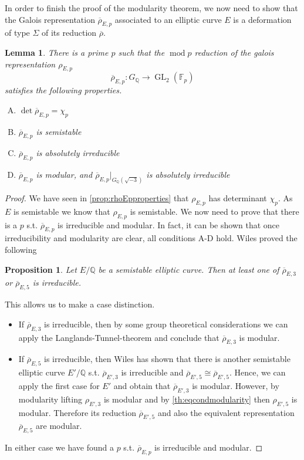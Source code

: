\documentclass{article}
\theoremstyle{plain}%
\newtheorem{lemma}[theorem]{Lemma}
\newtheorem{proposition}[theorem]{Proposition}
\theoremstyle{definition}
\theoremstyle{remark}
\newcommand{\GL}{\operatorname{GL}}
\begin{document}
In order to finish the proof of the modularity theorem, we now need to show that
the Galois representation \(\overline{\rho}_{E,p}\) associated to an elliptic curve \(E\)
is a deformation of type \(\Sigma\) of its reduction \(\overline{\rho}\).
\begin{lemma}\label{lem:ADproperties}
    There is a prime \(p\) such that the \(\operatorname{mod} p\) reduction of the galois representation \(\rho_{E,p}\)
    \[
        \overline{\rho}_{E,p} \colon G_\mathbb{Q} \to \GL_2(\mathbb{F}_p)
    \]
    satisfies the following properties.
    \begin{enumerate}[(A)]
        \item \(\det \overline{\rho}_{E,p} = \chi_p\)
        \item \(\overline{\rho}_{E,p}\) is semistable
        \item \(\overline{\rho}_{E,p}\) is absolutely irreducible
        \item \(\overline{\rho}_{E,p}\) is modular, and \(\overline{\rho}_{E,p}|_{G_\mathbb{Q}(\sqrt{-3})}\) is absolutely irreducible
    \end{enumerate}
\end{lemma}
\begin{proof}
    We have seen in \cref{prop:rhoEpproperties} that \(\rho_{E, p}\) has determinant \(\chi_p\). %
    As \(E\) is semistable we know that \(\rho_{E, p}\) is semistable. %
    We now need to prove that there is a \(p\) s.t. \(\overline{\rho}_{E,p}\) is irreducible and modular.
    In fact, it can be shown that once irreducibility and modularity are clear, all conditions A-D hold.
    Wiles proved the following
    \begin{proposition}
        Let \(E/\mathbb{Q}\) be a semistable elliptic curve. Then at least one of 
        \(\overline \rho_{E,3}\) or  \(\overline \rho_{E,5}\) is irreducible.
    \end{proposition}%
    This allows us to make a case distinction.
    \begin{itemize}
        \item If \(\overline \rho_{E,3}\) is irreducible, then by some group theoretical considerations 
        we can apply the Langlands-Tunnel-theorem and conclude that \(\overline{\rho}_{E, 3}\) is modular.
        \item If \(\overline \rho_{E,5}\) is irreducible, then Wiles has shown that there is another 
        semistable elliptic curve \(E'/\mathbb{Q}\) s.t. \(\overline{\rho}_{E',3}\) 
        is irreducible and \(\overline{\rho}_{E', 5} \cong \overline{\rho}_{E', 5}\).
        Hence, we can apply the first case for \(E'\) and obtain that \(\overline{\rho}_{E',3}\) is modular.
        However, by modularity lifting \(\rho_{E', 3}\) is modular and by \cref{th:eqcondmodularity}
        then \(\rho_{E', 5}\) is modular. Therefore its reduction \(\overline{\rho}_{E',5}\) and also 
        the equivalent representation \(\overline{\rho}_{E,5}\) are modular.
    \end{itemize}
    In either case we have found a \(p\) s.t. \(\overline{\rho}_{E,p}\) is irreducible and modular.
\end{proof}
\end{document}
